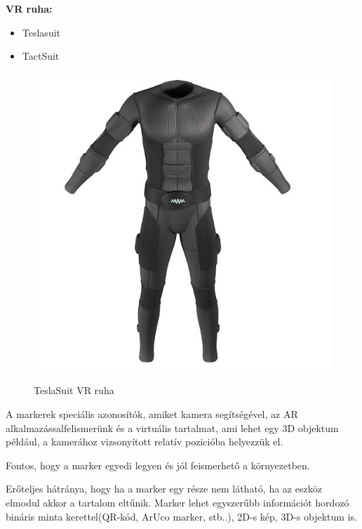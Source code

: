 {\bf VR ruha:}
\begin{itemize}
\item Teslasuit
\item TactSuit
\end{itemize}

\begin{figure}[htp]
    \centering
   	\includegraphics[width=5truecm, height=3.8truecm]{images/tesla.jpg}
	\caption{TeslaSuit VR ruha}
	\cite{tesla}
\end{figure}



A markerek speciális azonosítók, amiket kamera segítségével, az AR alkalmazássalfelismerünk és a virtuális tartalmat, ami lehet egy  3D objektum például, a kamerához vizsonyított relatív pozicióba helyezzük el. 

Fontos, hogy a marker egyedi legyen és jól feismerhető a környezetben. 

Erőteljes hátránya, hogy ha a marker egy része nem látható, ha az eszköz elmodul akkor a tartalom eltűnik.
Marker lehet egyszerűbb információt hordozó bináris minta kerettel(QR-kód, ArUco marker, stb..), 2D-s kép, 3D-s objektum is.


